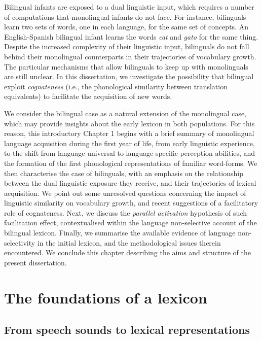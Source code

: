\documentclass[
  12pt,
  b5paperpaper,
  twoside]{scrreprt}
\begin{document}
Bilingual infants are exposed to a dual linguistic input, which requires
a number of computations that monolingual infants do not face. For
instance, bilinguals learn two sets of words, one in each language, for
the same set of concepts. An English-Spanish bilingual infant learns the
words \emph{cat} and \emph{gato} for the same thing. Despite the
increased complexity of their linguistic input, bilinguals do not fall
behind their monolingual counterparts in their trajectories of
vocabulary growth. The particular mechanisms that allow bilinguals to
keep up with monolinguals are still unclear. In this dissertation, we
investigate the possibility that bilingual exploit \emph{cognateness}
(i.e., the phonological similarity between translation equivalents) to
facilitate the acquisition of new words.

We consider the bilingual case as a natural extension of the monolingual
case, which may provide insights about the early lexicon in both
populations. For this reason, this introductory Chapter 1 begins with a
brief summary of monolingual language acquisition during the first year
of life, from early linguistic experience, to the shift from
language-universal to language-specific perception abilities, and the
formation of the first phonological representations of familiar
word-forms. We then characterise the case of bilinguals, with an
emphasis on the relationship between the dual linguistic exposure they
receive, and their trajectories of lexical acquisition. We point out
some unresolved questions concerning the impact of linguistic similarity
on vocabulary growth, and recent suggestions of a facilitatory role of
cognateness. Next, we discuss the \emph{parallel activation} hypothesis
of such facilitation effect, contextualised within the language
non-selective account of the bilingual lexicon. Finally, we summarise
the available evidence of language non-selectivity in the initial
lexicon, and the methodological issues therein encountered. We conclude
this chapter describing the aims and structure of the present
dissertation.

\hypertarget{the-foundations-of-a-lexicon}{%
\section{The foundations of a
lexicon}\label{the-foundations-of-a-lexicon}}

\hypertarget{from-speech-sounds-to-lexical-representations}{%
\subsection{From speech sounds to lexical
representations}\label{from-speech-sounds-to-lexical-representations}}
\end{document}
